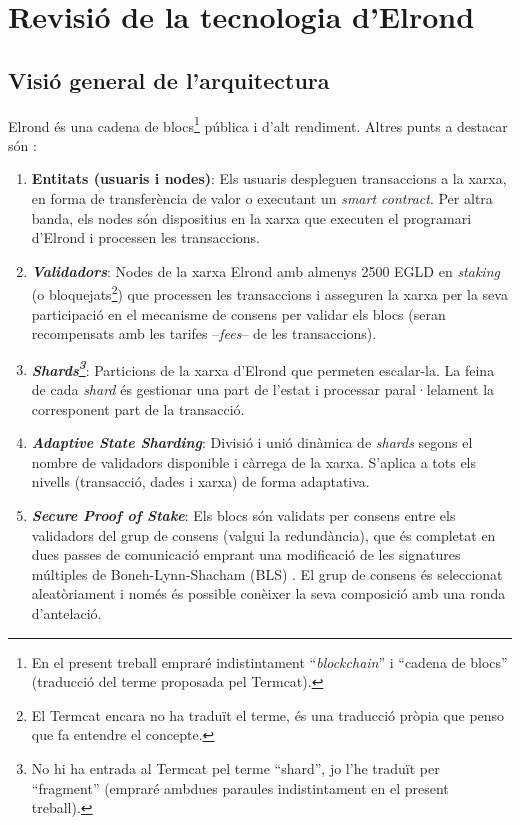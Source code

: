 \documentclass[11pt,a4paper]{article}
\begin{document}
\clearpage

\section{Revisió de la tecnologia d'Elrond}\label{sec:revelrond}

\subsection{Visió general de l'arquitectura}
Elrond és una cadena de blocs\footnote{En el present treball empraré indistintament ``\textit{blockchain}'' i ``cadena de blocs'' (traducció del terme proposada pel Termcat).} pública i d'alt rendiment. Altres punts a destacar són \cite{elrond2022}\cite{elrond2022-2}:
\begin{enumerate}
  \item \textbf{Entitats (usuaris i nodes)}: Els usuaris despleguen transaccions a la xarxa, en forma de transferència de valor o executant un \textit{smart contract}. Per altra banda, els nodes són dispositius en la xarxa que executen el programari d'Elrond i processen les transaccions.
  \item \textbf{\textit{Validadors}}: Nodes de la xarxa Elrond amb almenys 2500 EGLD en \textit{staking} (o bloquejats\footnote{El Termcat encara no ha traduït el terme, és una traducció pròpia que penso que fa entendre el concepte.}) que processen les transaccions i asseguren la xarxa per la seva participació en el mecanisme de consens per validar els blocs (seran recompensats amb les tarifes –\textit{fees}– de les transaccions).
  \item \textbf{\textit{Shards\footnote{No hi ha entrada al Termcat pel terme ``shard'', jo l'he traduït per ``fragment'' (empraré ambdues paraules indistintament en el present treball).}}}: Particions de la xarxa d'Elrond que permeten escalar-la. La feina de cada \textit{shard} és gestionar una part de l'estat i processar paral·lelament la corresponent part de la transacció.
  \item \textbf{\textit{Adaptive State Sharding}}: Divisió i unió dinàmica de \textit{shards} segons el nombre de validadors disponible i càrrega de la xarxa. S'aplica a tots els nivells (transacció, dades i xarxa) de forma adaptativa.
  \item \textbf{\textit{Secure Proof of Stake}}: Els blocs són validats per consens entre els validadors del grup de consens (valgui la redundància), que és completat en dues passes de comunicació emprant una modificació de les signatures múltiples de Boneh-Lynn-Shacham (BLS) \cite{Boneh2004}. El grup de consens és seleccionat aleatòriament i només és possible conèixer la seva composició amb una ronda d'antelació.

\end{enumerate}
\end{document}
